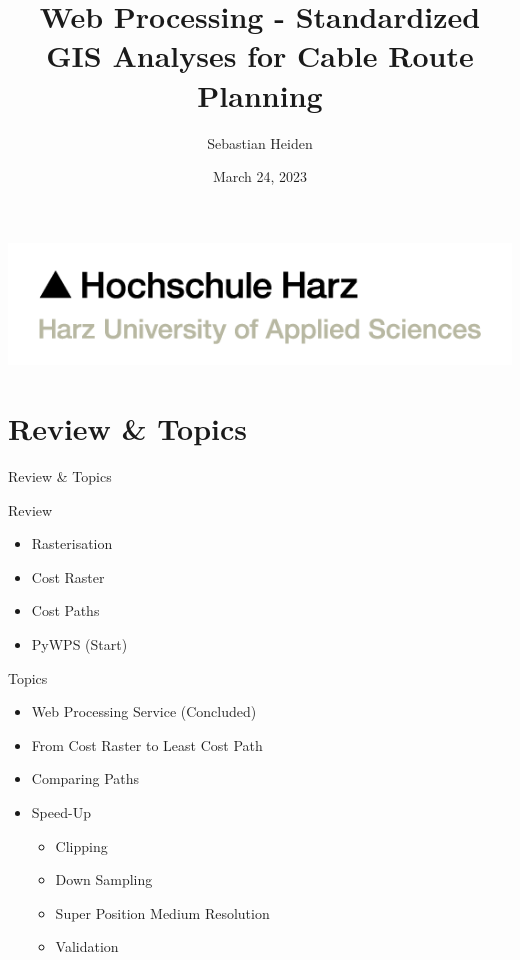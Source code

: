 \documentclass[usenames,dvipsnames,aspectratio=169]{beamer}
\title{Web Processing - Standardized GIS Analyses for Cable Route Planning}
\author{Sebastian Heiden}
\institute{Harz University of Applied Sciences}
\date{March 24, 2023}
\begin{document}
	
	
	
	\begin{frame}[plain]
		\includegraphics[scale=0.21]{images/3-HSH-Logo-RGB-en.png}
		\maketitle
	\end{frame}
	
	
	\section{Review \& Topics}
	\begin{frame}{Review \& Topics}
		
		\begin{minipage}[t]{0.48\textwidth}
			Review
			\begin{itemize}
				\item Rasterisation
				\item Cost Raster
				\item Cost Paths
				\item PyWPS (Start)
			\end{itemize}
		\end{minipage}
		\hfill	
		\begin{minipage}[t]{0.48\textwidth}
			Topics
			\begin{itemize}
				\item Web Processing Service (Concluded)
				\item From Cost Raster to Least Cost Path
				\item Comparing Paths
				\item Speed-Up
				\begin{itemize}
					\item Clipping
					\item Down Sampling
					\item Super Position Medium Resolution
					\item Validation
				\end{itemize}
				
			\end{itemize}
		\end{minipage}
		
	\end{frame}
	
\end{document}
